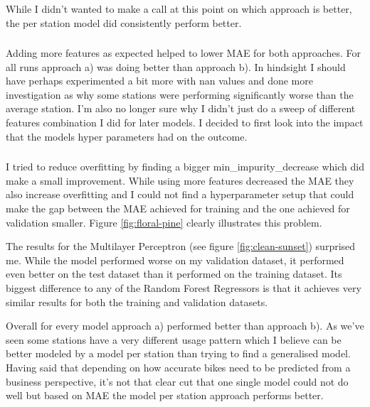 \documentclass[a4paper]{article}
\begin{document}
        While I didn't wanted to make a call at this point on which approach is better, the per station model did consistently
        perform better.

        \subsubsection*{}
        Adding more features as expected helped to lower MAE for both approaches. For all runs approach a) was
        doing better than approach b). In hindsight I should have perhaps experimented a bit more with nan values and
        done more investigation as why some stations were performing significantly worse than the average station. I'm also
        no longer sure why I didn't just do a sweep of different features combination I did for later models.
        I decided to first look into the impact that the models hyper parameters had on the outcome.

        \subsubsection*{}

        I tried to reduce overfitting by finding a bigger min\_impurity\_decrease which did make
        a small improvement. While using more features decreased the MAE they also increase overfitting and I
        could not find a hyperparameter setup that could make the gap between the MAE achieved for training and the one achieved
        for validation smaller. Figure \ref{fig:floral-pine} clearly illustrates this problem.

        The results for the Multilayer Perceptron (see figure \ref{fig:clean-sunset}) surprised me. While the model performed
        worse on my validation dataset, it performed even better on the test dataset than it performed on the training dataset.
        Its biggest difference to any of the Random Forest Regressors is that it achieves very similar results for both the
        training and validation datasets.

        Overall for every model approach a) performed better than approach b). As we've seen some stations have a very different
        usage pattern which I believe can be better modeled by a model per station than trying to find a generalised model.
        Having said that depending on how accurate bikes need to be predicted from a business perspective, it's not that clear
        cut that one single model could not do well but based on MAE the model per station approach performs better.
\end{document}
